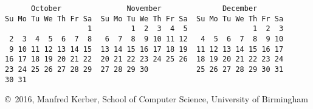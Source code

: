 \documentclass[12pt]{article}
\def\myfooter{\vfill{\footnotesize\noindent\copyright\ 2016, Manfred Kerber, School of Computer Science, University of Birmingham}}
\begin{document}
\begin{enumerate}
\begin{minipage}[t]{0.45\textwidth}
\begin{tiny}
\begin{verbatim}
      October               November              December        
Su Mo Tu We Th Fr Sa  Su Mo Tu We Th Fr Sa  Su Mo Tu We Th Fr Sa  
                   1         1  2  3  4  5               1  2  3  
 2  3  4  5  6  7  8   6  7  8  9 10 11 12   4  5  6  7  8  9 10  
 9 10 11 12 13 14 15  13 14 15 16 17 18 19  11 12 13 14 15 16 17  
16 17 18 19 20 21 22  20 21 22 23 24 25 26  18 19 20 21 22 23 24  
23 24 25 26 27 28 29  27 28 29 30           25 26 27 28 29 30 31  
30 31                                                             
\end{verbatim}
\end{tiny}
\end{minipage}
\end{enumerate}

\myfooter
\end{document}
